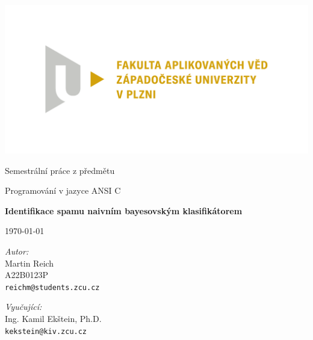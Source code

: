\documentclass[12pt, a4paper]{report}
\begin{document}
\begin{titlepage}
    \centering      %
    \Large          %
    \sffamily       %

    \includegraphics[width=.7\textwidth]{fav}

    Semestrální práce z předmětu

    Programování v jazyce ANSI C
    
    \vspace{18mm}
    {\Huge\bfseries Identifikace spamu naivním bayesovským klasifikátorem}

    \vspace{18mm}
    \today                          %

    \vfill                          %
    \raggedright                    %
    \textsl{Autor:}\\   %
    Martin Reich\\               %
    A22B0123P\\
    \texttt{reichm@students.zcu.cz}
    
    \vspace{\baselineskip}
    \textsl{Vyučující:}\\
    Ing. Kamil Ekštein, Ph.D.\\
    \texttt{kekstein@kiv.zcu.cz}
\end{titlepage}

\tableofcontents

\end{document}
